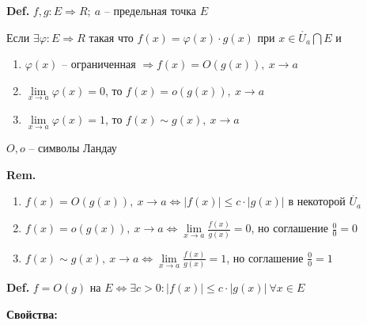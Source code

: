 \documentclass[14pt, letter paper]{article}
\begin{document}
\textbf{Def.} $f, g : E \Rightarrow R;\ a$ -- предельная точка $E$

Если $\exists \varphi : E \Rightarrow R$ такая что $f(x) = \varphi(x) \cdot g(x)$ при $x \in \mathring{U_a} \bigcap E$ и

\begin{enumerate}
    \item $\varphi(x)$ -- ограниченная $\Rightarrow f(x) = O(g(x)),\ x \rightarrow a$

    \item $\lim\limits_{x \rightarrow a}{\varphi(x)} = 0$, то $f(x) = o(g(x)),\ x \rightarrow a$

    \item $\lim\limits_{x \rightarrow a}{\varphi(x)} = 1$, то $f(x) \sim g(x),\ x \rightarrow a$
\end{enumerate}

$O, o$ -- символы Ландау

\vspace{3mm}

\textbf{Rem.} \begin{enumerate}
    \item $f(x) = O(g(x)),\ x \rightarrow a \Leftrightarrow |f(x)| \leq c \cdot |g(x)|$ в некоторой $\mathring{U_a}$

    \item $f(x) = o(g(x)),\ x \rightarrow a \Leftrightarrow \lim\limits_{x \rightarrow a}{\frac{f(x)}{g(x)}} = 0$, но соглашение $\frac{0}{0} = 0$

    \item $f(x) \sim g(x),\ x \rightarrow a \Leftrightarrow \lim\limits_{x \rightarrow a}{\frac{f(x)}{g(x)}} = 1$, но соглашение $\frac{0}{0} = 1$
\end{enumerate}

\vspace{3mm}

\textbf{Def.} $f = O(g)$ на $E \Leftrightarrow \exists c > 0 : |f(x)| \leq c \cdot |g(x)|\ \forall x \in E$

\vspace{5mm}

\textbf{Свойства:}
\end{document}
